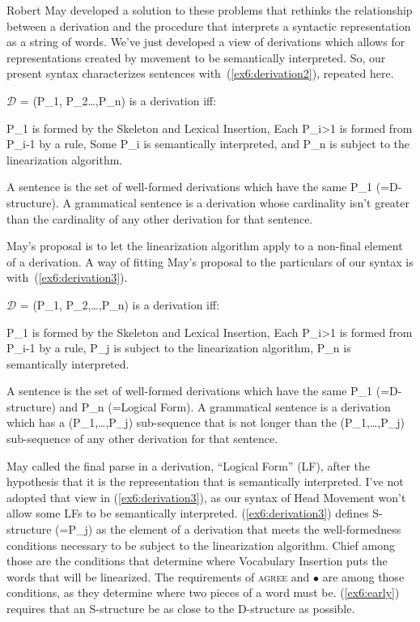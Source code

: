 Robert May\cite{May:1977,May:1985} developed a solution to these problems that rethinks the relationship between a derivation and the procedure that interprets a syntactic representation as a string of words. We've just developed a view of derivations which allows for representations created by movement to be semantically interpreted. So, our present syntax characterizes sentences with~(\ref{ex6:derivation2}), repeated here.
\begin{exe}
\raggedright
		$\mathcal{D}$ = (P_1, P_2\ldots,P_n) is a derivation iff:
		\begin{xlist}
			\ex P_1 is formed by the  Skeleton and Lexical Insertion,
			\ex Each P_{i>1} is formed from P_{i-1} by a rule,
			\ex Some P_i is semantically interpreted, and
			\ex P_n is subject to the linearization algorithm.
		\end{xlist}
		\marginnote[20pt]{The cardinality of a derivation is the number of Ps in it.}
		\sn A sentence is the set of well-formed derivations which have the same P_1 (=D-structure). A grammatical sentence is a derivation whose cardinality isn't greater than the cardinality of any other derivation for that sentence.
\end{exe}
May's proposal is to let the linearization algorithm apply to a non-final element of a derivation. A way of fitting May's proposal to the particulars of our syntax is with~(\ref{ex6:derivation3}).
\begin{exe}
\raggedright
	\ex \label{ex6:derivation3}
	$\mathcal{D}$ = (P_1, P_2,\ldots,P_n) is a derivation iff:
	\begin{xlist}
		\ex P_1 is formed by the  Skeleton and Lexical Insertion,
		\ex Each P_{i>1} is formed from P_{i-1} by a rule,
		\ex P_j is subject to the linearization algorithm, 
		\ex P_n is semantically interpreted.
	\end{xlist}
	\sn \label{ex6:early} A sentence is the set of well-formed derivations which have the same P_1 (=D-structure) and P_n (=Logical Form). A grammatical sentence is a derivation which has a (P_1,\ldots,P_j) sub-sequence that is not longer than the (P_1,\ldots,P_j) sub-sequence of any other derivation for that sentence.
\end{exe}
May called the final parse in a derivation, ``Logical Form'' (LF), after the hypothesis that it is the representation that is semantically interpreted. I've not adopted that view in (\ref{ex6:derivation3}), as our syntax of Head Movement won't allow some LFs to be semantically interpreted. %
%
%
%
(\ref{ex6:derivation3}) defines S-structure (=P_j) as the element of a derivation that meets the well-formedness conditions necessary to be subject to the linearization algorithm. Chief among those are the conditions that determine where Vocabulary Insertion puts the words that will be linearized. The requirements of \textsc{agree} and $\bullet$ are among those conditions, as they determine where two pieces of a word must be. (\ref{ex6:early}) requires that an S-structure be as close to the D-structure as possible. 

